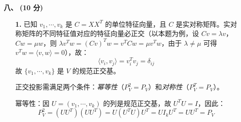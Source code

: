 \documentclass{ctexart}
\begin{document}
\begin{enumerate}
\begin{enumerate}
    \end{enumerate}
    \item[\textbf{八、}] \textbf{(10 分)} 
    \begin{enumerate}
        \item[\textbf{1.}] 已知 $v_1,\cdots,v_k$ 是 $C=XX^T$ 的单位特征向量，且 $C$ 是实对称矩阵。实对称矩阵的不同特征值对应的特征向量必正交（以本题为例，设 $Cv=\lambda v$，$Cw=\mu w$，则 $\lambda v^{T}w=(Cv)^{T}w=v^{T}Cw=\mu v^{T}w$，由于 $\lambda\neq\mu$ 可得 $v^{T}w=\langle v,w \rangle=0$），故：  
        \[
        \langle v_i, v_j \rangle = v_i^T v_j = \delta_{ij}
        \]  
        故 $\{v_1,\cdots,v_k\}$ 是 $V$ 的规范正交基。
        
        正交投影需满足两个条件：\emph{幂等性}（$P_V^2=P_V$）和\emph{对称性}（$P_V^T=P_V$）。 

        幂等性：因 $U=(v_1,\cdots,v_k)$ 的列是规范正交基，故 $U^T U=I$，因此：  
        \[
        P_V^2 = (UU^T)(UU^T) = U(U^T U)U^T = UI_k U^T = UU^T = P_V
        \]  


\end{enumerate}
\end{enumerate}
\end{document}
